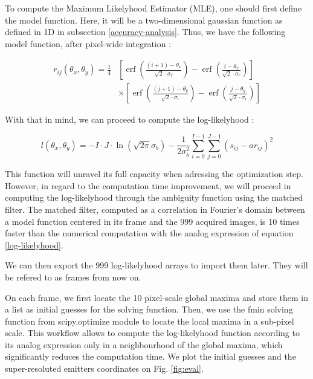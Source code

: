 \documentclass[10pt,letterpaper]{article}
\begin{document}
To compute the Maximum Likelyhood Estimator (MLE), one should first define the model function. Here, it will be a two-dimensional gaussian function as defined in 1D in subsection \ref{accuracy-analysis}. Thus, we have the following model function, after pixel-wide integration :

\begin{equation}
\begin{aligned}
r_{i j}\left(\theta_x, \theta_y\right)=\frac{1}{4}&\left[\operatorname{erf}\left(\frac{(i+1)-\theta_x}{\sqrt{2} \cdot \sigma_r}\right)-\operatorname{erf}\left(\frac{i-\theta_x}{\sqrt{2} \cdot \sigma_r}\right)\right] \\
& \times\left[\operatorname{erf}\left(\frac{(j+1)-\theta_y}{\sqrt{2} \cdot \sigma_r}\right)-\operatorname{erf}\left(\frac{j-\theta_y}{\sqrt{2} \cdot \sigma_r}\right)\right]
\end{aligned}
\end{equation}

With that in mind, we can proceed to compute the log-likelyhood :

\begin{equation} \label{log-likelyhood}
     l\left(\theta_x, \theta_y\right)=-I \cdot J \cdot \ln \left(\sqrt{2 \pi} \sigma_b\right)-\frac{1}{2 \sigma_b^2} \sum_{i=0}^{I-1} \sum_{j=0}^{J-1}\left(s_{i j}-a r_{i j}\right)^2
\end{equation}

This function will unravel its full capacity when adressing the optimization step. However, in regard to the computation time improvement, we will proceed in computing the log-likelyhood through the ambiguity function using the matched filter. The matched filter, computed as a correlation in Fourier's domain between a model function centered in its frame and the 999 acquired images, is 10 times faster than the numerical computation with the analog expression of equation \ref{log-likelyhood}.

We can then export the 999 log-likelyhood arrays to import them later. They will be refered to as frames from now on.

On each frame, we first locate the 10 pixel-scale global maxima and store them in a list as initial guesses for the solving function. Then, we use the fmin solving function from scipy.optimize module to locate the local maxima in a sub-pixel scale. This workflow allows to compute the log-likelyhood function according to its analog expression only in a neighbourhood of the global maxima, which significantly reduces the computation time. We plot the initial guesses and the super-resoluted emitters coordinates on Fig. \ref{fig:eval}.
\end{document}
